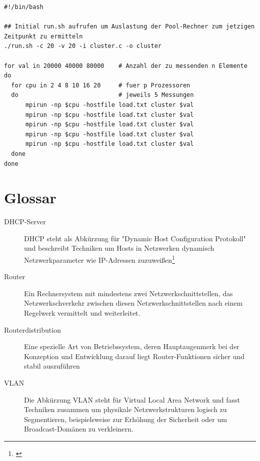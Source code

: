 \documentclass[a4paper,12pt]{scrartcl}
\begin{document}
\begin{lstlisting}[captionpos=b, caption=MPI BASH-Script: bench.sh, label=mpibenchsh]
#!/bin/bash

## Initial run.sh aufrufen um Auslastung der Pool-Rechner zum jetzigen Zeitpunkt zu ermitteln
./run.sh -c 20 -v 20 -i cluster.c -o cluster

for val in 20000 40000 80000	# Anzahl der zu messenden n Elemente
do
  for cpu in 2 4 8 10 16 20		# fuer p Prozessoren
  do							# jeweils 5 Messungen
	  mpirun -np $cpu -hostfile load.txt cluster $val
	  mpirun -np $cpu -hostfile load.txt cluster $val
	  mpirun -np $cpu -hostfile load.txt cluster $val
	  mpirun -np $cpu -hostfile load.txt cluster $val
	  mpirun -np $cpu -hostfile load.txt cluster $val
  done
done
\end{lstlisting}


\clearpage

\section{Glossar}
\begin{description}
 \item[DHCP-Server] DHCP steht als Abk\"urzung f\"ur "Dynamic Host
Configuration Protokoll" und beschreibt Techniken um Hosts in Netzwerken
dynamisch Netzwerkparameter wie IP-Adressen zuzuwei\ss{}en\footnote{\cite{dhcp}}
 \item[Router] Ein Rechnersystem mit mindestens zwei Netzwerkschnittstellen,
das Netzwerkschverkehr zwischen diesen Netzwerkschnittstellen nach einem
Regelwerk vermittelt und weiterleitet.
 \item[Routerdistribution] Eine spezielle Art von Betriebssystem, deren
Hauptaugenmerk bei der Konzeption und Entwicklung darauf liegt
Router-Funktionen sicher und stabil auszuf\"uhren
 \item[VLAN] Die Abk\"urzung VLAN steht f\"ur Virtual Local Area Network und
fasst Techniken zusammen um physikale Netzwerkstrukturen logisch zu
Segmentieren, beispielsweise zur Erh\"ohung der Sicherheit oder um
Broadcast-Dom\"anen zu verkleinern.
\end{description}
\clearpage
\end{document}
